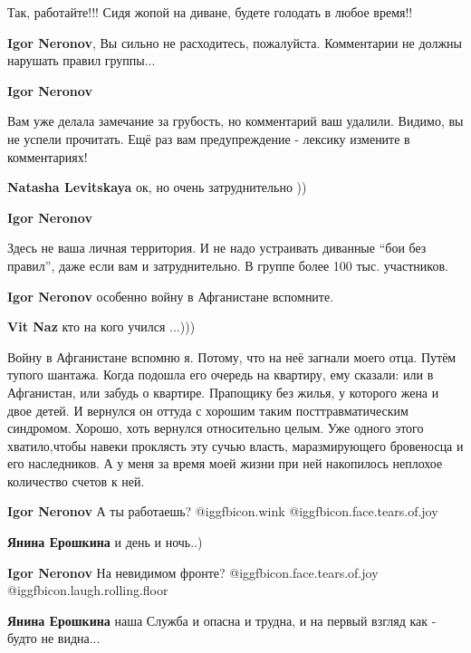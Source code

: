 \begin{itemize}
\begin{itemize}
\begin{itemize}
Так, работайте!!! Сидя жопой на диване, будете голодать в любое время!!

\textbf{Igor Neronov}, Вы сильно не расходитесь, пожалуйста. Комментарии не должны нарушать правил группы...

\textbf{Igor Neronov}

Вам уже делала замечание за грубость, но комментарий ваш удалили. Видимо, вы не
успели прочитать. Ещё раз вам предупреждение - лексику измените в комментариях!


\textbf{Natasha Levitskaya} ок, но очень затруднительно ))

\textbf{Igor Neronov}

Здесь не ваша личная территория. И не надо устраивать диванные \enquote{бои без
правил}, даже если вам и затруднительно. В группе более 100 тыс. участников.


\textbf{Igor Neronov} особенно войну в Афганистане вспомните.

\textbf{Vit Naz} кто на кого учился ...)))

\end{itemize} %


Войну в Афганистане вспомню я. Потому, что на неё загнали моего отца. Путём
тупого шантажа. Когда подошла его очередь на квартиру, ему сказали: или в
Афганистан, или забудь о квартире. Прапощику без жилья, у которого жена и двое
детей. И вернулся он оттуда с хорошим таким посттравматическим синдромом.
Хорошо, хоть вернулся относительно целым. Уже одного этого хватило,чтобы навеки
проклясть эту сучью власть, маразмирующего бровеносца и его наследников. А у
меня за время моей жизни при ней накопилось неплохое количество счетов к ней.


\textbf{Igor Neronov} А ты работаешь? @igg{fbicon.wink}  @igg{fbicon.face.tears.of.joy} 

\begin{itemize} %
\textbf{Янина Ерошкина} и день и ночь..)

\textbf{Igor Neronov} На невидимом фронте? @igg{fbicon.face.tears.of.joy}  @igg{fbicon.laugh.rolling.floor} 

\textbf{Янина Ерошкина} наша Служба и опасна и трудна, и на первый взгляд как - будто не видна...
\end{itemize} %


\end{itemize}
\end{itemize}
